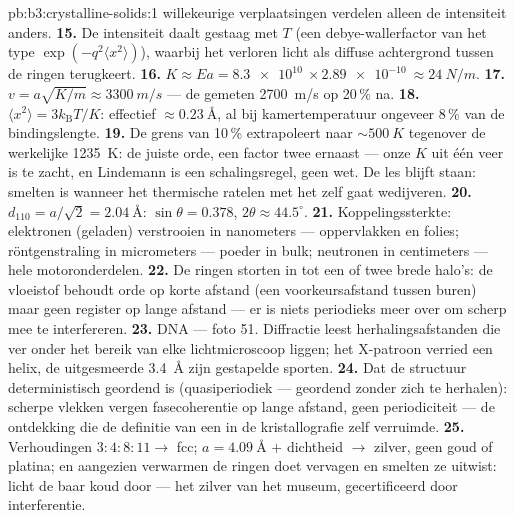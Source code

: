 \begin{solution}{pb:b3:crystalline-solids:1}
willekeurige verplaatsingen verdelen alleen de intensiteit anders.
\textbf{15.} De intensiteit daalt gestaag met $T$ (een debye-wallerfactor
van het type $\exp(-q^2\langle x^2\rangle)$), waarbij het
verloren licht als diffuse achtergrond tussen de ringen terugkeert.
\textbf{16.} $K \approx Ea = \qty{8.3e10}{}\times
\qty{2.89e-10}{} \approx \qty{24}{N/m}$.
\textbf{17.} $v = a\sqrt{K/m} \approx \qty{3300}{m/s}$ ---
de gemeten \qty{2700}{m/s} op 20\,\% na.
\textbf{18.} $\langle x^2\rangle = 3k_{\text{B}}T/K$: effectief
$\approx\qty{0.23}{\angstrom}$, al bij kamertemperatuur ongeveer 8\,\% van de
bindingslengte.
\textbf{19.} De grens van 10\,\% extrapoleert naar $\sim\qty{500}{K}$
tegenover de werkelijke \qty{1235}{K}: de juiste orde, een factor twee ernaast
--- onze $K$ uit één veer is te zacht, en Lindemann is een schalingsregel,
geen wet. De les blijft staan: smelten is wanneer het thermische
ratelen met het  zelf gaat wedijveren.
\textbf{20.} $d_{110} = a/\sqrt2 = \qty{2.04}{\angstrom}$:
$\sin\theta = 0.378$, $2\theta \approx 44.5^\circ$.
\textbf{21.} Koppelingssterkte: elektronen (geladen) verstrooien in
nanometers --- oppervlakken en folies; röntgenstraling in micrometers ---
poeder in bulk; neutronen in centimeters --- hele motoronderdelen.
\textbf{22.} De ringen storten in tot een of twee brede halo's:
de vloeistof behoudt orde op korte afstand (een voorkeursafstand
tussen buren) maar geen register op lange afstand --- er is niets periodieks meer over om
scherp mee te interfereren.
\textbf{23.} DNA --- foto 51. Diffractie leest herhalings\-afstanden
die ver onder het bereik van elke lichtmicroscoop liggen; het X-patroon
verried een helix, de uitgesmeerde \qty{3.4}{\angstrom} zijn gestapelde
sporten.
\textbf{24.} Dat de structuur deterministisch geordend is
(quasiperiodiek --- geordend zonder zich te herhalen): scherpe vlekken vergen
fasecoherentie op lange afstand, geen periodiciteit --- de ontdekking
die de definitie van een  in de kristallografie zelf verruimde.
\textbf{25.} Verhoudingen $3:4:8:11 \to$ fcc; $a = \qty{4.09}{\angstrom}$
$+$ dichtheid $\to$ zilver, geen goud of platina; en aangezien verwarmen
de ringen doet vervagen en smelten ze uitwist: licht de baar koud door ---
het zilver van het museum, gecertificeerd door interferentie.
\end{solution}
